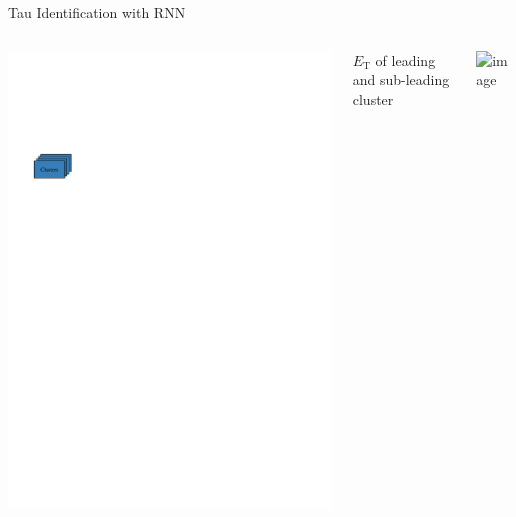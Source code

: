 \documentclass[11pt, xcolor={dvipsnames}, aspectratio=169]{beamer}
\begin{document}

\begin{frame}{Tau Identification with RNN}
  \begin{columns}[onlytextwidth]
     \centering

    \includegraphics[scale=1]{tauid/cluster_icon}


    {\centering
      $E_{\text{T}}$ of leading and sub-leading cluster\\[0.17em]
    }

    \begin{columns}[onlytextwidth]
       \centering

      \includegraphics<1>[width=0.9\textwidth]{tauid/invars/invars_cls0relet_3P}


\end{columns}
\end{columns}
\end{frame}
\end{document}

